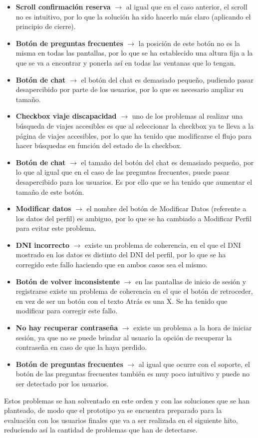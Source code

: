 \begin{itemize}
    \item \textbf{Scroll confirmación reserva} $\rightarrow$ al igual que en el caso anterior, el scroll no es intuitivo, por lo que la solución ha sido hacerlo más claro (aplicando el principio de cierre).
    \item \textbf{Botón de preguntas frecuentes} $\rightarrow$ la posición de este botón no es la misma en todas las pantallas, por lo que se ha establecido una altura fija a la que se va a encontrar y ponerla así en todas las ventanas que lo tengan.
    \item \textbf{Botón de chat} $\rightarrow$ el botón del chat es demasiado pequeño, pudiendo pasar desapercibido por parte de los usuarios, por lo que es necesario ampliar su tamaño.
    \item \textbf{Checkbox viaje discapacidad} $\rightarrow$ uno de los problemas al realizar una búsqueda de viajes accesibles es que al seleccionar la checkbox ya te lleva a la página de viajes accesibles, por lo que ha tenido que modificarse el flujo para hacer búsquedas en función del estado de la checkbox.
    \item \textbf{Botón de chat} $\rightarrow$ el tamaño del botón del chat es demasiado pequeño, por lo que al igual que en el caso de las preguntas frecuentes, puede pasar desapercibido para los usuarios. Es por ello que se ha tenido que aumentar el tamaño de este botón.
    \item \textbf{Modificar datos} $\rightarrow$ el nombre del botón de Modificar Datos (referente a los datos del perfil) es ambiguo, por lo que se ha cambiado a Modificar Perfil para evitar este problema.
    \item \textbf{DNI incorrecto} $\rightarrow$ existe un problema de coherencia, en el que el DNI mostrado en los datos es distinto del DNI del perfil, por lo que se ha corregido este fallo haciendo que en ambos casos sea el mismo.
    \item \textbf{Botón de volver inconsistente} $\rightarrow$ en las pantallas de inicio de sesión y registrarse existe un problema de coherencia en el que el botón de retroceder, en vez de ser un botón con el texto Atrás es una X. Se ha tenido que modificar para corregir este fallo.
    \item \textbf{No hay recuperar contraseña} $\rightarrow$ existe un problema a la hora de iniciar sesión, ya que no se puede brindar al usuario la opción de recuperar la contraseña en caso de que la haya perdido.
    \item \textbf{Botón de preguntas frecuentes} $\rightarrow$ al igual que ocurre con el soporte, el botón de las preguntas frecuentes también es muy poco intuitivo y puede no ser detectado por los usuarios.
\end{itemize}

Estos problemas se han solventado en este orden y con las soluciones que se han planteado, de modo que el prototipo ya se encuentra preparado para la evaluación con los
usuarios finales que va a ser realizada en el siguiente hito, reduciendo así la cantidad de problemas que han de detectarse.
